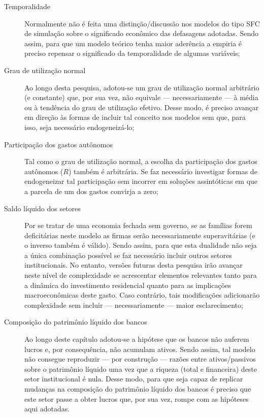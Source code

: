 \begin{description}
	\item[Temporalidade] Normalmente não é feita uma distinção/discussão nos modelos do tipo SFC de simulação sobre o significado econômico das defasagens adotadas. Sendo assim, para que um modelo teórico tenha maior aderência a empiria é preciso repensar o significado da temporalidade de algumas variáveis;
	\item[Grau de utilização normal] Ao longo desta pesquisa, adotou-se um grau de utilização normal arbitrário (e constante) que, por sua vez, não equivale --- necessariamente --- à média ou à tendência do grau de utilização efetivo. Desse modo, é preciso avançar em direção às formas de incluir tal conceito nos modelos sem que, para isso, seja necessário endogeneizá-lo;
	\item[Participação dos gastos autônomos] Tal como o grau de utilização normal, a escolha da participação dos gastos autônomos ($R$) também é arbitrária. Se faz necessário investigar formas de endogeneizar tal participação sem incorrer em soluções assintóticas em que a parcela de um dos gastos convirja a zero;
	\item[Saldo líquido dos setores] Por se tratar de uma economia fechada sem governo, se as famílias forem deficitárias neste modelo as firmas serão necessariamente superavitárias (e o inverso também é válido).
	Sendo assim, para que esta dualidade não seja a única combinação possível se faz necessário incluir outros setores institucionais. No entanto, versões futuras desta pesquisa irão avançar neste nível de complexidade se acrescentar elementos relevantes tanto para a dinâmica do investimento residencial quanto para as implicações macroeconômicas deste gasto. Caso contrário, tais modificações adicionarão complexidade sem incluir --- necessariamente --- maior esclarecimento;
	\item[Composição do patrimônio líquido dos bancos] Ao longo deste capítulo adotou-se a hipótese que os bancos não auferem lucros e, por consequência, não acumulam ativos.
	Sendo assim, tal modelo não consegue reproduzir --- por construção --- razões entre ativos/passivos sobre o patrimônio líquido uma vez que a riqueza (total e financeira) deste setor institucional é nula.
	Desse modo, para que seja capaz de replicar mudanças na composição do patrimônio líquido dos bancos é preciso que este setor passe a obter lucros que, por sua vez, rompe com as hipóteses aqui adotadas.
\end{description}

